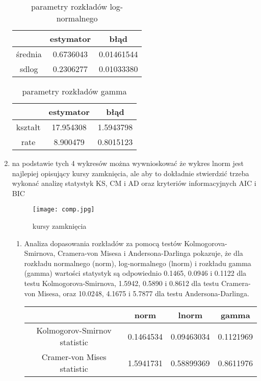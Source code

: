 \documentclass{article}
\begin{document}
\begin{enumerate}
\begin{table}[h]
			\centering
			\begin{tabular}{|c|c|c|}
				\hline
				& estymator & błąd \\
				\hline
				średnia & 0.6736043 & 0.01461544 \\
				\hline
				sdlog & 0.2306277 & 0.01033380 \\
				\hline
			\end{tabular}
			\caption{parametry rozkładów log-normalnego}
		\end{table}
		\begin{table}[h]
			\renewcommand\tablename{Tabela}
			\centering
			\begin{tabular}{|c|c|c|}
				\hline
				& estymator & błąd \\
				\hline
				kształt & 17.954308  & 1.5943798 \\
				\hline
				rate & 8.900479  & 0.8015123 \\
				\hline
			\end{tabular}
			\caption{parametry rozkładów gamma}
		\end{table}
	\newpage
	\item
		na podstawie tych 4 wykresów można wywnioskować że wykres lnorm jest najlepiej opisujący kursy zamknięcia, ale aby to dokładnie stwierdzić trzeba wykonać analizę statystyk KS, CM i AD oraz kryteriów informacyjnych AIC i BIC
		\begin{figure}[H]
			\centering
			\renewcommand\figurename{Wykres}
			\texttt{[image: comp.jpg]}
			\caption{kursy zamknięcia}
		\end{figure}
	\newpage
		\begin{enumerate}
			\item Analiza dopasowania rozkładów za pomocą testów Kolmogorova-Smirnova, Cramera-von Misesa i Andersona-Darlinga pokazuje, że dla rozkładu normalnego (norm), log-normalnego (lnorm) i rozkładu gamma (gamma) wartości statystyk są odpowiednio 0.1465, 0.0946 i 0.1122 dla testu Kolmogorova-Smirnova, 1.5942, 0.5890 i 0.8612 dla testu Cramera-von Misesa, oraz 10.0248, 4.1675 i 5.7877 dla testu Andersona-Darlinga.
		\begin{table}[h]
			\renewcommand\tablename{Tabela}
			\centering
			\begin{tabular}{|c|c|c|c|}
				\hline
				& norm & lnorm & gamma \\
				\hline
				Kolmogorov-Smirnov statistic & 0.1464534 & 0.09463034 & 0.1121969 \\
				\hline
				Cramer-von Mises statistic & 1.5941731 & 0.58899369 & 0.8611976 \\

\end{tabular}
\end{table}
\end{enumerate}
\end{enumerate}
\end{document}
